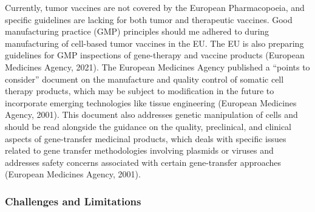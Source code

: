 \documentclass[
]{article}
\begin{document}
Currently, tumor vaccines are not covered by the European Pharmacopoeia,
and specific guidelines are lacking for both tumor and therapeutic
vaccines. Good manufacturing practice (GMP) principles should me adhered
to during manufacturing of cell-based tumor vaccines in the EU. The EU
is also preparing guidelines for GMP inspections of gene-therapy and
vaccine products (European Medicines Agency, 2021). The European
Medicines Agency published a ``points to consider'' document on the
manufacture and quality control of somatic cell therapy products, which
may be subject to modification in the future to incorporate emerging
technologies like tissue engineering (European Medicines Agency, 2001).
This document also addresses genetic manipulation of cells and should be
read alongside the guidance on the quality, preclinical, and clinical
aspects of gene-transfer medicinal products, which deals with specific
issues related to gene transfer methodologies involving plasmids or
viruses and addresses safety concerns associated with certain
gene-transfer approaches (European Medicines Agency, 2001).

\subsubsection{Challenges and
Limitations}\label{challenges-and-limitations}
\end{document}
